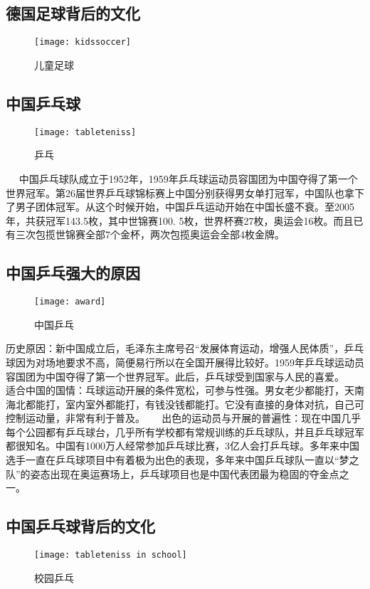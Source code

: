 \subsection{德国足球背后的文化}
\begin{figure}[htb]
    \centering
    \texttt{[image: kidssoccer]}
    \caption{儿童足球}
\end{figure}

\subsection{中国乒乓球}
\begin{figure}[htb]
    \centering
    \texttt{[image: tableteniss]}
    \caption{乒乓}
\end{figure}

    中国乒乓球队成立于1952年，1959年乒乓球运动员容国团为中国夺得了第一个世界冠军。第26届世界乒乓球锦标赛上中国分别获得男女单打冠军，中国队也拿下了男子团体冠军。从这个时候开始，中国乒乓运动开始在中国长盛不衰。至2005年，共获冠军143.5枚，其中世锦赛100. 5枚，世界杯赛27枚，奥运会16枚。而且已有三次包揽世锦赛全部7个金杯，两次包揽奥运会全部4枚金牌。

\subsection{中国乒乓强大的原因}
\begin{figure}[htb]
    \centering
    \texttt{[image: award]}
    \caption{中国乒乓}
\end{figure}

    历史原因：新中国成立后，毛泽东主席号召“发展体育运动，增强人民体质”，乒乓球因为对场地要求不高，简便易行所以在全国开展得比较好。1959年乒乓球运动员容国团为中国夺得了第一个世界冠军。此后，乒乓球受到国家与人民的喜爱。 
    适合中国的国情：乓球运动开展的条件宽松，可参与性强。男女老少都能打，天南海北都能打，室内室外都能打，有钱没钱都能打。它没有直接的身体对抗，自己可控制运动量，非常有利于普及。 
    出色的运动员与开展的普遍性：现在中国几乎每个公园都有乒乓球台，几乎所有学校都有常规训练的乒乓球队，并且乒乓球冠军都很知名。中国有1000万人经常参加乒乓球比赛，3亿人会打乒乓球。多年来中国选手一直在乒乓球项目中有着极为出色的表现，多年来中国乒乓球队一直以“梦之队”的姿态出现在奥运赛场上，乒乓球项目也是中国代表团最为稳固的夺金点之一。

\subsection{中国乒乓球背后的文化}
\begin{figure}[htb]
    \centering
    \texttt{[image: tableteniss in school]}
    \caption{校园乒乓}
\end{figure}


